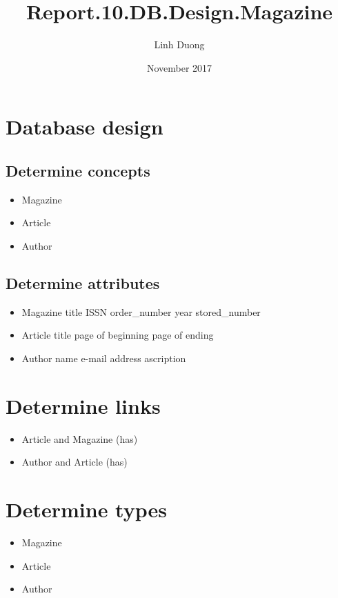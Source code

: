 \documentclass{article}
\title{Report.10.DB.Design.Magazine}
\author{Linh Duong}
\date{November 2017}
\begin{document}
\maketitle

\section{Database design}
\subsection{Determine concepts}
\begin{itemize}
    \item Magazine
    \item Article
    \item Author
\end{itemize}

\subsection{Determine attributes}
\begin{itemize}
    \item Magazine
    \subitem title
    \subitem ISSN
    \subitem order\_number
    \subitem year
    \subitem stored\_number
    
    \item Article
    \subitem title
    \subitem page of beginning
    \subitem page of ending 
    
    \item Author
    \subitem name
    \subitem e-mail address
    \subitem ascription

\end{itemize}

\section{Determine links}
\begin{itemize}
    \item Article and Magazine (has)
    \item Author and Article (has)
\end{itemize}

\section{Determine types}
\begin{itemize}
    \item Magazine
    \item Article
    \item Author
\end{itemize}
\end{document}
